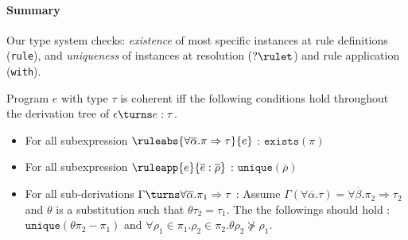 \paragraph{Summary}
Our type system checks:  
\textit{existence} of most specific instances at rule definitions (\texttt{rule}), and
\textit{uniqueness} of instances at resolution ($?\rulet$) and rule application (\texttt{with}).

\begin{definition}
Program $e$ with type $\tau$ is coherent iff the following conditions hold throughout
the derivation tree of $\epsilon \turns e:\tau$.
\begin{itemize}
\item 
  For all subexpression $\ruleabs{\forall \overline{\alpha}.\pi\Rightarrow \tau}{e}$ :
    $\texttt{exists}(\pi)$
\item
  For all subexpression $\ruleapp{e}{\overline{e}:\overline{\rho}}$ :
    \mbox{$\texttt{unique}$}$(\overline{\rho})$
\item
  For all sub-derivations 
  $\Gamma \turns \forall \overline{\alpha}. \pi_1 \Rightarrow \tau$ :
    Assume $\Gamma(\forall \overline{\alpha}.\tau) 
    = \forall \overline{\beta}.\pi_2 \Rightarrow \tau_2$
    and $\theta$ is a substitution such that $\theta \tau_2 = \tau_1$.
    The the followings should hold : $\texttt{unique}(\theta\pi_2 - \pi_1)$
    and $\forall \rho_1 \in \pi_1.\rho_2 \in \pi_2. \theta\rho_2 \nsucceq \rho_1$.
\end{itemize}
\end{definition}



